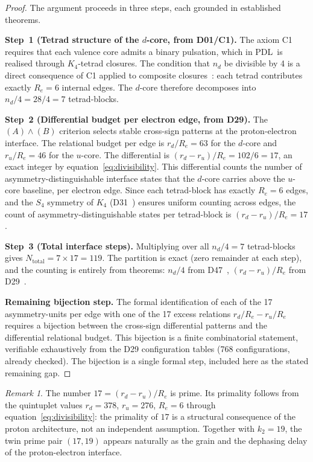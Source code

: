 \documentclass[12pt,a4paper]{article}
\theoremstyle{plain}
\theoremstyle{definition}
\theoremstyle{remark}
\newtheorem{remark}[theorem]{Remark}
\newcommand{\PDL}{\textsc{PDL}}
\newcommand{\Kfour}{K_4}
\renewcommand{\Re}{R_e}
\newcommand{\ru}{r_u}
\newcommand{\rd}{r_d}
\newcommand{\Ntot}{N_{\mathrm{total}}}
\newcommand{\ktwo}{k_2}
\begin{document}
\begin{proof}
The argument proceeds in three steps, each grounded in established theorems.

\textbf{Step~1 (Tetrad structure of the $d$-core, from D01/C1).} The axiom C1 requires that each valence core admits a binary pulsation, which in \PDL\ is realised through $\Kfour$-tetrad closures. The condition that $n_d$ be divisible by 4 is a direct consequence of C1 applied to composite closures~\cite{PDL_D01}: each tetrad contributes exactly $\Re = 6$ internal edges. The $d$-core therefore decomposes into $n_d/4 = 28/4 = 7$ tetrad-blocks.

\textbf{Step~2 (Differential budget per electron edge, from D29).} The $(A)\wedge(B)$ criterion selects stable cross-sign patterns at the proton-electron interface. The relational budget per edge is $\rd/\Re = 63$ for the $d$-core and $\ru/\Re = 46$ for the $u$-core. The differential is $(\rd-\ru)/\Re = 102/6 = 17$, an exact integer by equation~\eqref{eq:divisibility}. This differential counts the number of asymmetry-distinguishable interface states that the $d$-core carries above the $u$-core baseline, per electron edge. Since each tetrad-block has exactly $\Re = 6$ edges, and the $S_4$ symmetry of $\Kfour$ (D31~\cite{PDL_D31}) ensures uniform counting across edges, the count of asymmetry-distinguishable states per tetrad-block is $(\rd-\ru)/\Re = 17$.

\textbf{Step~3 (Total interface steps).} Multiplying over all $n_d/4 = 7$ tetrad-blocks gives $\Ntot = 7 \times 17 = 119$. The partition is exact (zero remainder at each step), and the counting is entirely from theorems: $n_d/4$ from D47~\cite{PDL_D47}, $(\rd-\ru)/\Re$ from D29~\cite{PDL_D29}.

\textbf{Remaining bijection step.} The formal identification of each of the 17 asymmetry-units per edge with one of the 17 excess relations $\rd/\Re - \ru/\Re$ requires a bijection between the cross-sign differential patterns and the differential relational budget. This bijection is a finite combinatorial statement, verifiable exhaustively from the D29 configuration tables (768 configurations, already checked). The bijection is a single formal step, included here as the stated remaining gap.
\end{proof}

\begin{remark}
The number $17 = (\rd-\ru)/\Re$ is prime. Its primality follows from the quintuplet values $\rd = 378$, $\ru = 276$, $\Re = 6$ through equation~\eqref{eq:divisibility}: the primality of $17$ is a structural consequence of the proton architecture, not an independent assumption. Together with $\ktwo = 19$, the twin prime pair $(17, 19)$ appears naturally as the grain and the dephasing delay of the proton-electron interface.
\end{remark}
\end{document}
